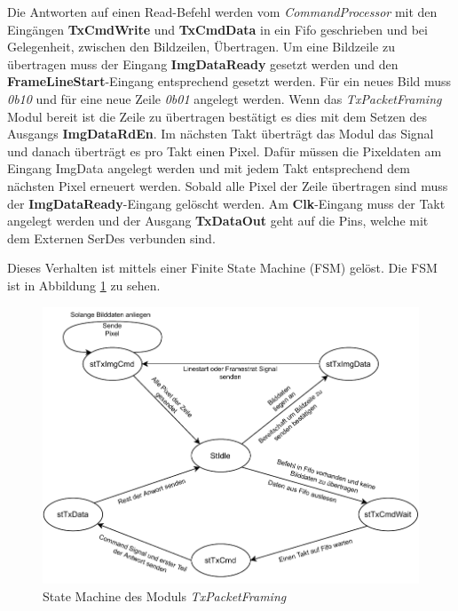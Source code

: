 \documentclass{article}
\begin{document}
Die Antworten auf einen Read-Befehl werden vom \textit{CommandProcessor} mit den Eingängen \textbf{TxCmdWrite} und \textbf{TxCmdData} in ein Fifo geschrieben und bei Gelegenheit, zwischen den Bildzeilen, Übertragen.
Um eine Bildzeile zu übertragen muss der Eingang \textbf{ImgDataReady} gesetzt werden und den \textbf{FrameLineStart}-Eingang entsprechend gesetzt werden. Für ein neues Bild muss \textit{0b10} und für eine neue Zeile \textit{0b01} angelegt werden. Wenn das \textit{TxPacketFraming} Modul bereit ist die Zeile zu übertragen bestätigt es dies mit dem Setzen des Ausgangs \textbf{ImgDataRdEn}. Im nächsten Takt überträgt das Modul das Signal und danach überträgt es pro Takt einen Pixel. Dafür müssen die Pixeldaten am Eingang {ImgData} angelegt werden und mit jedem Takt entsprechend dem nächsten Pixel erneuert werden. Sobald alle Pixel der Zeile übertragen sind muss der \textbf{ImgDataReady}-Eingang gelöscht werden. Am \textbf{Clk}-Eingang muss der Takt angelegt werden und der Ausgang \textbf{TxDataOut} geht auf die Pins, welche mit dem Externen SerDes verbunden sind.

Dieses Verhalten ist mittels einer Finite State Machine (FSM) gelöst. Die FSM ist in Abbildung \ref{fig:fsm_tx_packet_framing} zu sehen.

\begin{figure}[tb]
    \includegraphics[width=\linewidth]{drawio/fsm_tx_packet_framing}
    \caption{State Machine des Moduls \textit{TxPacketFraming}}
    \label{fig:fsm_tx_packet_framing}
\end{figure}
\end{document}

